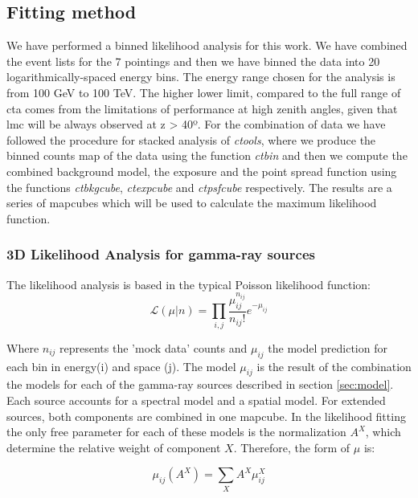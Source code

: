 \documentclass[main.tex]{subfiles}
\begin{document}
\subsection{Fitting method}

We have performed a binned likelihood analysis for this work. We have combined the event lists for the 7 pointings and then we have binned the data into 20 logarithmically-spaced energy bins. The energy range chosen for the analysis is from 100 GeV to 100 TeV. The higher lower limit, compared to the full range of \gls{cta} comes from the limitations of performance at high zenith angles, given that \gls{lmc} will be always observed at z > 40º.
For the combination of data we have followed the procedure for stacked analysis of \textit{ctools}, where we produce the binned counts map of the data using the function \textit{ctbin} and then we compute the combined background model, the exposure and the point spread function using the functions \textit{ctbkgcube}, \textit{ctexpcube} and \textit{ctpsfcube} respectively. The results are a series of mapcubes which will be used to calculate the maximum likelihood function.

\subsubsection{3D Likelihood Analysis for gamma-ray sources}

The likelihood analysis is based in the typical Poisson likelihood function:
\begin{equation}
  \mathcal{L}(\mu | n) = \prod_{i,j}\frac{\mu_{ij}^{n_{ij}}}{n_{ij}!}e^{-\mu_{ij}}
  \label{eq:likelihood}
\end{equation}

Where $n_{ij}$ represents the 'mock data' counts and $\mu_{ij}$ the model prediction for each bin in energy(i) and space (j). The model $\mu_{ij}$ is the result of the combination the models for each of the gamma-ray sources described in section \ref{sec:model}. Each source accounts for a spectral model and a spatial model. For extended sources, both components are combined in one mapcube. In the likelihood fitting the only free parameter for each of these models is the normalization $A^{X}$, which determine the relative weight of component $X$. Therefore, the form of $\mu$ is:

\begin{equation}
  \mu_{ij}(A^{X}) = \sum_{X} A^{X} \mu^{X}_{ij}
\end{equation}
\end{document}
